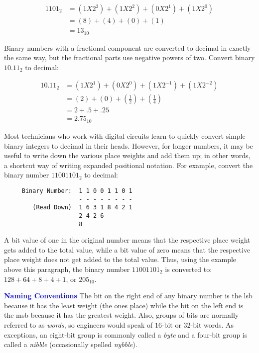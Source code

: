 \begin{align}
  1101_2 &= (1X2^3)+(1X2^2)+(0X2^1)+(1X2^0) \\
  \nonumber
  &= (8)+(4)+(0)+(1) \\
  \nonumber
  &= 13_{10}
\end{align}

Binary numbers with a fractional component are converted to decimal in exactly the same way, but the fractional parts use negative powers of two. Convert binary $ 10.11_2 $ to decimal: 

\begin{align}
  10.11_2 &= (1X2^1)+(0X2^0)+(1X2^{-1})+(1X2^{-2}) \\
  \nonumber
  &= (2)+(0)+(\frac{1}{2})+(\frac{1}{4}) \\
  \nonumber
  &= 2+.5+.25 \\
  \nonumber
  &= 2.75_{10}
\end{align}

Most technicians who work with digital circuits learn to quickly convert simple binary integers to decimal in their heads. However, for longer numbers, it may be useful to write down the various place weights and add them up; in other words, a shortcut way of writing expanded positional notation. For example, convert the binary number $ 11001101_2 $ to decimal: 

\begin{verbatim}
     Binary Number:  1 1 0 0 1 1 0 1
                     - - - - - - - - 
        (Read Down)  1 6 3 1 8 4 2 1 
                     2 4 2 6     
                     8 
\end{verbatim}

A bit value of one in the original number means that the respective place weight gets added to the total value, while a bit value of zero means that the respective place weight does not get added to the total value. Thus, using the example above this paragraph, the binary number $ 11001101_2 $ is converted to: $ 128+64+8+4+1 $, or $ 205_{10} $.

\bigskip

\begin{tcolorbox}[colback=blue!5!white,colframe=blue!75!black]
  \textcolor{blue}{\textbf{Naming Conventions}}
  \tcblower
  The bit on the right end of any binary number is the \gls{lsb} because it has the least weight (the ones place) while the bit on the left end is the \gls{msb} because it has the greatest weight. Also, groups of bits are normally referred to as \emph{words}, so engineers would speak of $ 16 $-bit or $ 32 $-bit words. As exceptions, an eight-bit group is commonly called a \emph{byte} and a four-bit group is called a \emph{nibble} (occasionally spelled \emph{nybble}).
\end{tcolorbox}

